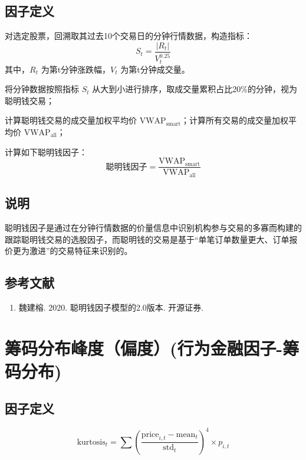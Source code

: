 \documentclass{article}
\begin{document}
\subsection{因子定义}

对选定股票，回溯取其过去10个交易日的分钟行情数据，构造指标：
\begin{equation}
    S_t = \frac{|R_t|}{V_t^{0.25}}
\end{equation}
其中，\( R_t \) 为第t分钟涨跌幅，\( V_t \) 为第t分钟成交量。

将分钟数据按照指标 \( S_t \) 从大到小进行排序，取成交量累积占比20\%的分钟，视为聪明钱交易；

计算聪明钱交易的成交量加权平均价 \( \mathrm{VWAP}_{\mathrm{smart}} \)；计算所有交易的成交量加权平均价 \( \mathrm{VWAP}_{\mathrm{all}} \)；

计算如下聪明钱因子：
\begin{equation}
    \text{聪明钱因子} = \frac{\mathrm{VWAP}_{\mathrm{smart}}}{\mathrm{VWAP}_{\mathrm{all}}}
\end{equation}

\subsection{说明}
聪明钱因子是通过在分钟行情数据的价量信息中识别机构参与交易的多寡而构建的跟踪聪明钱交易的选股因子，而聪明钱的交易是基于“单笔订单数量更大、订单报价更为激进”的交易特征来识别的。

\subsection{参考文献}
\begin{enumerate}
    \item 魏建榕. 2020. 聪明钱因子模型的2.0版本. 开源证券.
\end{enumerate}

\section{筹码分布峰度（偏度）(行为金融因子-筹码分布)}

\subsection{因子定义}

\begin{equation}
    \mathrm{kurtosis}_t = \sum \left( \frac{\mathrm{price}_{i,t} - \mathrm{mean}_t}{\mathrm{std}_t} \right)^4 \times p_{i,t}
\end{equation}
\end{document}
